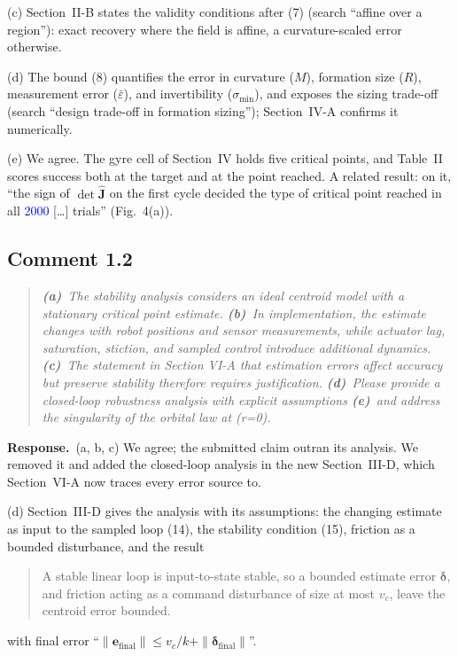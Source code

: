\documentclass[10pt]{article}
\newcommand{\newnum}[1]{\textcolor{blue}{#1}}        %
\newcommand{\resp}{\par\textbf{Response.}~}
\newenvironment{newtext}{\begin{quote}\small\sloppy}{\end{quote}}
\begin{document}
(c) Section~II-B states the validity conditions after (7) (search ``affine over a region''): exact recovery where the field is affine, a curvature-scaled error otherwise.

(d) The bound (8) quantifies the error in curvature ($M$), formation size ($R$), measurement error ($\bar\varepsilon$), and invertibility ($\sigma_{\min}$), and exposes the sizing trade-off (search ``design trade-off in formation sizing''); Section~IV-A confirms it numerically.

(e) We agree. The gyre cell of Section~IV holds five critical points, and Table~II scores success both at the target and at the point reached. A related result: on it, ``the sign of $\det\hat{\mathbf{J}}$ on the first cycle decided the type of critical point reached in all \newnum{2000} [\ldots] trials'' (Fig.~4(a)).

\subsection*{Comment 1.2}

\begin{quote}\itshape
\textbf{(a)}~The stability analysis considers an ideal centroid model with a stationary critical point estimate.
\textbf{(b)}~In implementation, the estimate changes with robot positions and sensor measurements, while actuator lag, saturation, stiction, and sampled control introduce additional dynamics.
\textbf{(c)}~The statement in Section VI-A that estimation errors affect accuracy but preserve stability therefore requires justification.
\textbf{(d)}~Please provide a closed-loop robustness analysis with explicit assumptions
\textbf{(e)}~and address the singularity of the orbital law at (r=0).
\end{quote}

\resp (a, b, c) We agree; the submitted claim outran its analysis. We removed it and added the closed-loop analysis in the new Section~III-D, which Section~VI-A now traces every error source to.

(d) Section~III-D gives the analysis with its assumptions: the changing estimate as input to the sampled loop (14), the stability condition (15), friction as a bounded disturbance, and the result
\begin{newtext}
A stable linear loop is input-to-state stable, so a bounded estimate error $\boldsymbol{\delta}$, and friction acting as a command disturbance of size at most $v_c$, leave the centroid error bounded.
\end{newtext}
with final error ``$\|\mathbf{e}_{\text{final}}\| \le v_c/k + \|\boldsymbol{\delta}_{\text{final}}\|$''.
\end{document}
